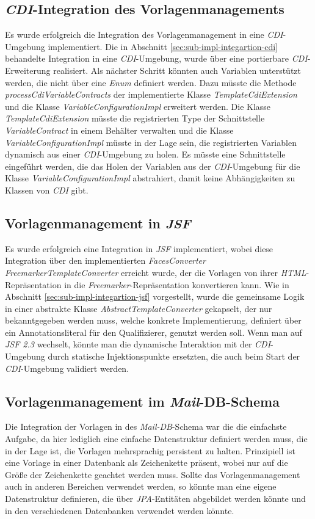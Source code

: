 \subsection{\emph{CDI}-Integration des Vorlagenmanagements}
Es wurde erfolgreich die Integration des Vorlagenmanagement in eine \emph{CDI}-Umgebung implementiert. Die in Abschnitt \ref{sec:sub-impl-integartion-cdi} behandelte Integration in eine \emph{CDI}-Umgebung, wurde über eine portierbare \emph{CDI}-Erweiterung realisiert. Als nächster Schritt könnten auch Variablen unterstützt werden, die nicht über eine \emph{Enum} definiert werden. Dazu müsste die Methode \emph{processCdiVariableContracts}  der implementierte Klasse \emph{TemplateCdiExtension} und die Klasse \emph{VariableConfigurationImpl} erweitert werden. Die Klasse \emph{TemplateCdiExtension} müsste die registrierten Type der Schnittstelle \emph{VariableContract} in einem Behälter verwalten und die Klasse \emph{VariableConfigurationImpl} müsste in der Lage sein, die registrierten Variablen dynamisch aus einer \emph{CDI}-Umgebung zu holen. Es müsste eine Schnittstelle eingeführt werden, die das Holen der Variablen aus der \emph{CDI}-Umgebung für die Klasse \emph{VariableConfigurationImpl} abstrahiert, damit keine Abhängigkeiten zu Klassen von \emph{CDI} gibt.

\subsection{Vorlagenmanagement in \emph{JSF}}
Es wurde erfolgreich eine Integration in \emph{JSF} implementiert, wobei diese Integration über den implementierten \emph{FacesConverter} \emph{FreemarkerTemplateConverter} erreicht wurde, der die Vorlagen von ihrer \emph{HTML}-Repräsentation in die \emph{Freemarker}-Repräsentation konvertieren kann. Wie in Abschnitt \ref{sec:sub-impl-integartion-jsf} vorgestellt, wurde die gemeinsame Logik in einer abstrakte Klasse \emph{AbstractTemplateConverter} gekapselt, der nur bekanntgegeben werden muss, welche konkrete Implementierung, definiert über ein Annotationsliteral für den Qualifizierer, genutzt werden soll. Wenn man auf \emph{JSF 2.3} wechselt, könnte man die dynamische Interaktion mit der \emph{CDI}-Umgebung durch statische Injektionspunkte ersetzten, die auch beim Start der \emph{CDI}-Umgebung validiert werden. 

\subsection{Vorlagenmanagement im \emph{Mail}-DB-Schema}
Die Integration der Vorlagen in des \emph{Mail-DB}-Schema war die die einfachste Aufgabe, da hier lediglich eine einfache Datenstruktur definiert werden muss, die in der Lage ist, die Vorlagen mehrsprachig persistent zu halten. Prinzipiell ist eine Vorlage in einer Datenbank als Zeichenkette präsent, wobei nur auf die Größe der Zeichenkette geachtet werden muss. Sollte das Vorlagenmanagement auch in anderen Bereichen verwendet werden, so könnte man eine eigene Datenstruktur definieren, die über \emph{JPA}-Entitäten abgebildet werden könnte und in den verschiedenen Datenbanken verwendet werden könnte.
